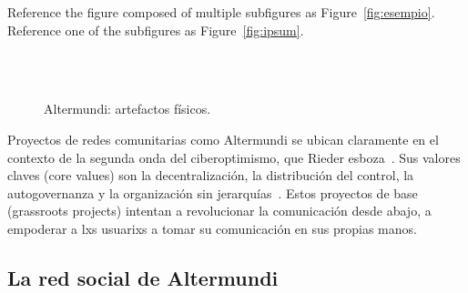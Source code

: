 Reference the figure composed of multiple subfigures as Figure~\vref{fig:esempio}. Reference one of the subfigures as Figure~\vref{fig:ipsum}. %

\begin{figure}[tb]
\centering
{} \quad
{} \\
 \quad
{} \\
 \quad
{}
\caption[A number of pictures.]{Altermundi: artefactos físicos.} %
\label{fig:esempio}
\end{figure}

Proyectos de redes comunitarias como Altermundi se ubican claramente en el contexto de la segunda onda del ciberoptimismo, que Rieder esboza~\autocite{Rieder2012}.
Sus valores claves (core values) son la decentralización, la distribución del control, la autogovernanza y la organización sin jerarquías~\autocite{FiTre2015}.
Estos proyectos de base (grassroots projects) intentan a revolucionar la comunicación desde abajo, a empoderar a lxs usuarixs a tomar su comunicación en sus propias manos.

\begin{comment}
* community network projects: are to be found in the context of (2nd wave) cyber optimism: "decentralization", "distributed control", "self-governance", "non-hierarchical organization"
an attempt at a capillary revolution -> ist es erfolgreich?
\end{comment}


\subsection{La red social de Altermundi}


